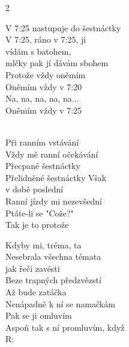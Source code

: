 \newpage
{}
\begin{multicols}{2}

\thispagestyle{empty}

\vspace{-5px}
\cho{}
V 7:25 nastupuje do šestnáctky\\
V 7:25, ráno v 7:25, ji\\
vídám s batohem,\\
 mlčky pak jí dávám sbohem\\
Protože vždy oněmím\\
Oněmím vždy v 7:20\\
Na, na, na, na, na...\\

\vspace{-5px}
Oněmím vždy v 7:25

\vspace{-5px}
\\
\vspace{-5px}
\ve{}
Při ranním vstávání\\
Vždy mě ranní očekávání\\
Přecpané šestnáctky\\
Přelidněné šestnáctky Však\\ 
v době poslední\\
Ranní jízdy mi nezevšední\\
Ptáte-li se "Cože?"\\
Tak je to protože
\vspace{-5px}
\cho{}
\vspace{-5px}


\ve{}
Kdyby mi, tréma, ta\\
Nesebrala všechna témata\\
jak řeči zavésti\\
Beze trapných předzvězstí\\
Až bude zatáčka\\
Nenápadně k ní se namačkám\\
Pak se ji omluvím\\
Aspoň tak s ní promluvím, když\\
R:
\vspace{-5px}
\re{}
\\
\vfill\columnbreak\vspace*{\fill}




\end{multicols}
